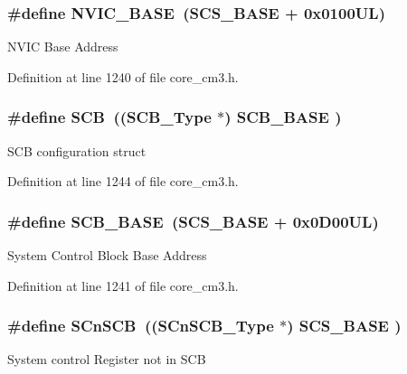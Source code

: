 \subsubsection[{\texorpdfstring{N\+V\+I\+C\+\_\+\+B\+A\+SE}{NVIC_BASE}}]{\setlength{\rightskip}{0pt plus 5cm}\#define N\+V\+I\+C\+\_\+\+B\+A\+SE~({\bf S\+C\+S\+\_\+\+B\+A\+SE} +  0x0100\+U\+L)}\hypertarget{group__CMSIS__core__base_gaa0288691785a5f868238e0468b39523d}{}\label{group__CMSIS__core__base_gaa0288691785a5f868238e0468b39523d}
N\+V\+IC Base Address 

Definition at line 1240 of file core\+\_\+cm3.\+h.

\subsubsection[{\texorpdfstring{S\+CB}{SCB}}]{\setlength{\rightskip}{0pt plus 5cm}\#define S\+CB~(({\bf S\+C\+B\+\_\+\+Type}       $\ast$)     {\bf S\+C\+B\+\_\+\+B\+A\+SE}      )}\hypertarget{group__CMSIS__core__base_gaaaf6477c2bde2f00f99e3c2fd1060b01}{}\label{group__CMSIS__core__base_gaaaf6477c2bde2f00f99e3c2fd1060b01}
S\+CB configuration struct 

Definition at line 1244 of file core\+\_\+cm3.\+h.

\subsubsection[{\texorpdfstring{S\+C\+B\+\_\+\+B\+A\+SE}{SCB_BASE}}]{\setlength{\rightskip}{0pt plus 5cm}\#define S\+C\+B\+\_\+\+B\+A\+SE~({\bf S\+C\+S\+\_\+\+B\+A\+SE} +  0x0\+D00\+U\+L)}\hypertarget{group__CMSIS__core__base_gad55a7ddb8d4b2398b0c1cfec76c0d9fd}{}\label{group__CMSIS__core__base_gad55a7ddb8d4b2398b0c1cfec76c0d9fd}
System Control Block Base Address 

Definition at line 1241 of file core\+\_\+cm3.\+h.

\subsubsection[{\texorpdfstring{S\+Cn\+S\+CB}{SCnSCB}}]{\setlength{\rightskip}{0pt plus 5cm}\#define S\+Cn\+S\+CB~(({\bf S\+Cn\+S\+C\+B\+\_\+\+Type}    $\ast$)     {\bf S\+C\+S\+\_\+\+B\+A\+SE}      )}\hypertarget{group__CMSIS__core__base_ga9fe0cd2eef83a8adad94490d9ecca63f}{}\label{group__CMSIS__core__base_ga9fe0cd2eef83a8adad94490d9ecca63f}
System control Register not in S\+CB 

